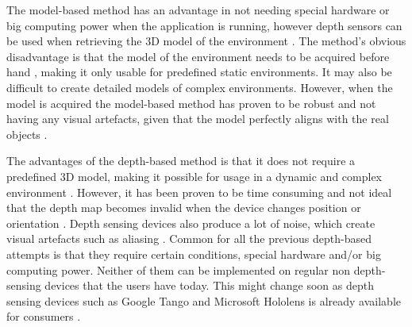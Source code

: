 The model-based method has an advantage in not needing special hardware or big computing power when the application is running, however depth sensors can be used when retrieving the 3D model of the environment \cite{tian2015handling}. The method's obvious disadvantage is that the model of the environment needs to be acquired before hand \cite{breen1996interactive, shah2012occlusion}, making it only usable for predefined static environments. It may also be difficult to create detailed models of complex environments. However, when the model is acquired the model-based method has proven to be robust and not having any visual artefacts, given that the model perfectly aligns with the real objects \cite{breen1996interactive}.

The advantages of the depth-based method is that it does not require a predefined 3D model, making it possible for usage in a dynamic and complex environment \cite{breen1996interactive, shah2012occlusion}. However, it has been proven to be time consuming \cite{tian2015handling} and not ideal that the depth map becomes invalid when the device changes position or orientation \cite{breen1996interactive, shah2012occlusion}. Depth sensing devices also produce a lot of noise, which create visual artefacts such as aliasing \cite{wloka1995resolving, shah2012occlusion, zhu2010handling}. Common for all the previous depth-based attempts is that they require certain conditions, special hardware and/or big computing power. Neither of them can be implemented on regular non depth-sensing devices that the users have today. This might change soon as depth sensing devices such as Google Tango and Microsoft Hololens is already available for consumers \cite{vergeTango, vergeHololens}.

